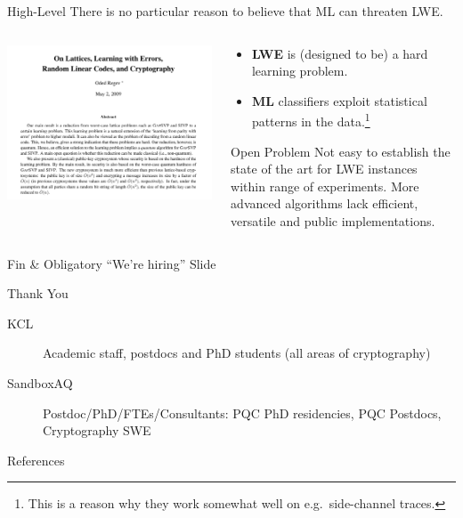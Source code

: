 \documentclass[xcolor=table,10pt,aspectratio=169]{beamer}
\begin{document}
\begin{frame}[label={sec:org36b881b}]{High-Level}
There is no particular reason to believe that ML can threaten LWE.

\begin{columns}
\begin{column}{0.6\columnwidth}
\begin{center}
\includegraphics[width=.9\linewidth]{./regev-hard-learning-problems.png}
\end{center}
\end{column}


\begin{column}{0.4\columnwidth}
\begin{itemize}
\item \textbf{LWE} is (designed to be) a hard learning problem.
\item \textbf{ML} classifiers exploit statistical patterns in the data.\footnote{This is a reason why they work somewhat well on e.g. side-channel traces.}
\end{itemize}

\begin{alertblock}{Open Problem}
Not easy to establish the state of the art for LWE instances within range of experiments. More advanced algorithms lack efficient, versatile and public implementations.
\end{alertblock}
\end{column}
\end{columns}
\end{frame}

\begin{frame}[label={sec:org321b4fa},standout]{Fin \& Obligatory ``We're hiring'' Slide}
\begin{center}
\Huge \alert{Thank You}
\end{center}

\begin{description}
\item[{KCL}] Academic staff, postdocs and PhD students (all areas of cryptography)
\item[{SandboxAQ}] Postdoc/PhD/FTEs/Consultants: PQC PhD residencies, PQC Postdocs, Cryptography SWE
\end{description}
\end{frame}

\begin{frame}[allowframebreaks]{References}
\renewcommand*{\bibfont}{\scriptsize}
\printbibliography[heading=none]
\end{frame}
\end{document}
